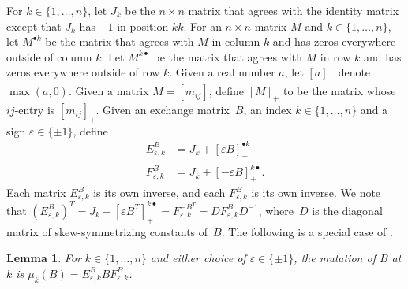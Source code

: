 \documentclass{amsart}
\newtheorem{lemma}[proposition]{Lemma}
\theoremstyle{definition}
\theoremstyle{remark}
\numberwithin{equation}{section}
\newcommand{\ep}{\varepsilon}
\newcommand{\sgn}{\operatorname{sgn}}
\newcommand{\set}[1]{{\lbrace #1 \rbrace}}
\newcommand{\0}{{\mathbf{0}}}
\newcommand{\symmetrizer}{{D}}
\begin{document}
For $k\in\set{1,\ldots,n}$, let $J_k$ be the $n\times n$ matrix that agrees with the identity matrix except that $J_k$ has $-1$ in position $kk$.
For an $n\times n$ matrix $M$ and $k\in\set{1,\ldots,n}$, let $M^{\bullet k}$ be the matrix that agrees with $M$ in column $k$ and has zeros everywhere outside of column $k$.
Let $M^{k\bullet}$ be the matrix that agrees with $M$ in row $k$ and has zeros everywhere outside of row $k$.
Given a real number $a$, let $[a]_+$ denote $\max(a,0)$.
Given a matrix $M=[m_{ij}]$, define $[M]_+$ to be the matrix whose $ij$-entry is $[m_{ij}]_+$.
Given an exchange matrix~$B$, an index $k\in\set{1,\ldots,n}$ and a sign $\ep\in\set{\pm1}$, define
\begin{align*}
E_{\ep,k}^B&=J_k+[\ep B]_+^{\bullet k}\\
F_{\ep,k}^B&=J_k+[-\ep B]_+^{k\bullet}.
\end{align*}
Each matrix $E_{\ep,k}^B$ is its own inverse, and each $F_{\ep,k}^B$ is its own inverse.
We note that $(E_{\ep,k}^B)^T=J_k+[\ep B^T]_+^{k\bullet}=F_{\ep,k}^{-B^T}=\symmetrizer F_{\ep,k}^B\symmetrizer^{-1}$, where~$\symmetrizer$ is the diagonal matrix of skew-symmetrizing constants of~$B$.
The following is a special case of \cite[(3.2)]{ca3}.
\begin{lemma}\label{EBF trick}
For $k\in\set{1,\ldots,n}$ and either choice of $\ep\in\set{\pm1}$, the mutation of $B$ at $k$ is $\mu_k(B)=E_{\ep,k}^BBF_{\ep,k}^B$.
\end{lemma}
\end{document}
